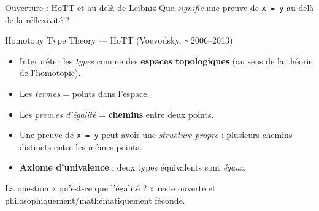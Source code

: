 \documentclass[aspectratio=169]{beamer}
\begin{document}
\begin{frame}{Ouverture : HoTT et au-delà de Leibniz}
  Que \emph{signifie} une preuve de \texttt{x = y} au-delà de la réflexivité ?
  \pause

  \begin{block}{Homotopy Type Theory — HoTT (Voevodsky, $\sim$2006--2013)}
    \begin{itemize}
      \item Interpréter les \emph{types} comme des \textbf{espaces topologiques}
        (au sens de la théorie de l'homotopie).
      \item Les \emph{termes} = points dans l'espace.
      \item Les \emph{preuves d'égalité} = \textbf{chemins} entre deux points.
      \item Une preuve de \texttt{x = y} peut avoir une \emph{structure propre} :
        plusieurs chemins distincts entre les mêmes points.
      \item \textbf{Axiome d'univalence} : deux types équivalents sont \emph{égaux}.
    \end{itemize}
  \end{block}

  \medskip
  La question « qu'est-ce que l'égalité ? » reste ouverte et philosophiquement/mathématiquement féconde.
\end{frame}
\end{document}
